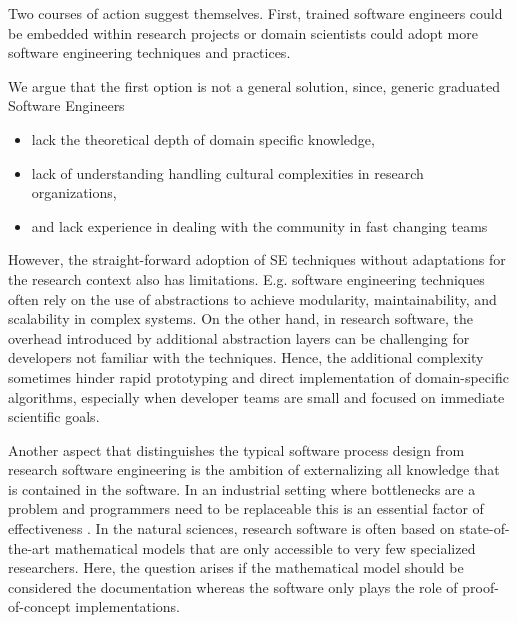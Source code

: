 \documentclass[
        twocolumn,german,biblatex
    ]{article}
\providecommand{\tightlist}{%
    \setlength{\itemsep}{0pt}\setlength{\parskip}{0pt}}
\begin{document}
    Two courses of action suggest themselves. First, trained software
    engineers could be embedded within research projects or domain
    scientists could adopt more software engineering techniques and
    practices.

    We argue that the first option is not a general solution, since,
    generic graduated Software Engineers

    \begin{itemize}
    \tightlist
    \item
      lack the theoretical depth of domain specific knowledge,
    \item
      lack of understanding handling cultural complexities in research
      organizations,
    \item
      and lack experience in dealing with the community in fast changing
      teams
    \end{itemize}

    However, the straight-forward adoption of SE techniques without
    adaptations for the research context also has limitations. E.g.
    software engineering techniques often rely on the use of
    abstractions to achieve modularity, maintainability, and scalability
    in complex systems. On the other hand, in research software, the
    overhead introduced by additional abstraction layers can be
    challenging for developers not familiar with the techniques. Hence,
    the additional complexity sometimes hinder rapid prototyping and
    direct implementation of domain-specific algorithms, especially when
    developer teams are small and focused on immediate scientific goals.

    Another aspect that distinguishes the typical software process
    design from research software engineering is the ambition of
    externalizing all knowledge that is contained in the software. In an
    industrial setting where bottlenecks are a problem and programmers
    need to be replaceable this is an essential factor of effectiveness
    \autocite{gronau2006kmdl}. In the natural sciences, research
    software is often based on state-of-the-art mathematical models that
    are only accessible to very few specialized researchers. Here, the
    question arises if the mathematical model should be considered the
    documentation whereas the software only plays the role of
    proof-of-concept implementations.
\end{document}
